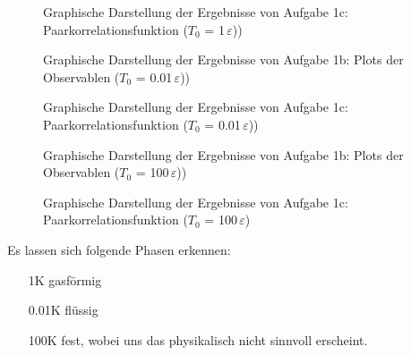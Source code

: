 \begin{landscape}
	\begin{figure}
		\caption{Graphische Darstellung der Ergebnisse von Aufgabe 1c: Paarkorrelationsfunktion ($T_0$ = 1$\,\varepsilon$))}
		\label{fig:paarb1}
	\end{figure}
\end{landscape} 

\begin{landscape}
	\begin{figure}
		\caption{Graphische Darstellung der Ergebnisse von Aufgabe 1b: Plots der Observablen ($T_0$ = 0.01$\,\varepsilon$))}
		\label{fig:observablen2}
	\end{figure}
\end{landscape} 


\begin{landscape}
	\begin{figure}
		\caption{Graphische Darstellung der Ergebnisse von Aufgabe 1c: Paarkorrelationsfunktion ($T_0$ = 0.01$\,\varepsilon$))}
		\label{fig:paarb2}
	\end{figure}
\end{landscape} 

\begin{landscape}
	\begin{figure}
		\caption{Graphische Darstellung der Ergebnisse von Aufgabe 1b: Plots der Observablen ($T_0$ = 100$\,\varepsilon$))}
		\label{fig:observablen3}
	\end{figure}
\end{landscape} 


\begin{landscape}
	\begin{figure}
		\caption{Graphische Darstellung der Ergebnisse von Aufgabe 1c: Paarkorrelationsfunktion ($T_0$ = 100$\,\varepsilon$)}
		\label{fig:paarb3}
	\end{figure}
\end{landscape} 

Es lassen sich folgende Phasen erkennen:
\begin{enumerate}
\item[1K] gasförmig \\
\item[0.01K] flüssig \\
\item[100K] fest, wobei uns das physikalisch nicht sinnvoll erscheint.\\
\end{enumerate}

